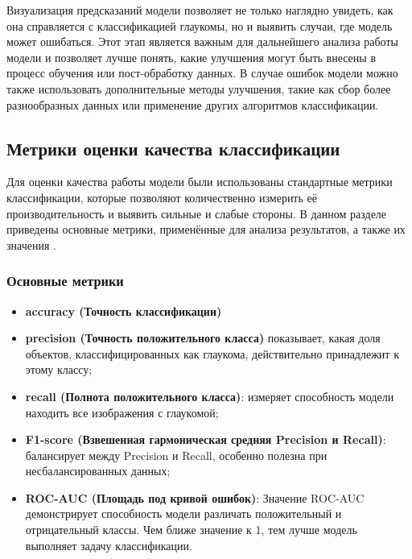 {    Визуализация предсказаний модели позволяет не только наглядно увидеть, как она справляется с классификацией глаукомы, но и выявить случаи, где модель может ошибаться. Этот этап является важным для дальнейшего анализа работы модели и позволяет лучше понять, какие улучшения могут быть внесены в процесс обучения или пост-обработку данных. В случае ошибок модели можно также использовать дополнительные методы улучшения, такие как сбор более разнообразных данных или применение других алгоритмов классификации.

    \vspace{13pt}
    \subsection{Метрики оценки качества классификации}

    Для оценки качества работы модели были использованы стандартные метрики классификации, которые позволяют количественно измерить её производительность и выявить сильные и слабые стороны. В данном разделе приведены основные метрики, применённые для анализа результатов, а также их значения \cite{metrics}.

    \subsubsection*{Основные метрики}

    \begin{itemize}
        \item \textbf{accuracy (Точность классификации)}
        
        \item \textbf{precision (Точность положительного класса)}
                показывает, какая доля объектов, классифицированных как глаукома, действительно принадлежит к этому классу;

        \item \textbf{recall (Полнота положительного класса)}:
        измеряет способность модели находить все изображения с глаукомой;

        \item \textbf{F1-score (Взвешенная гармоническая средняя Precision и  Recall)}:
        балансирует между Precision и Recall, особенно полезна при несбалансированных данных;

        \item \textbf{ROC-AUC (Площадь под кривой ошибок)}:
        Значение ROC-AUC демонстрирует способность модели различать положительный и отрицательный классы. Чем ближе значение к 1, тем лучше модель выполняет задачу классификации.
    \end{itemize}

}
